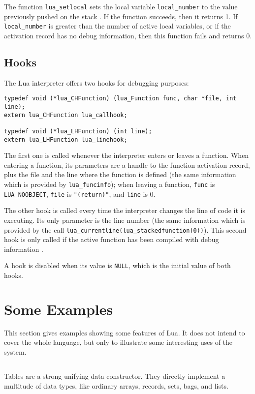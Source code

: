 The function \verb'lua_setlocal' sets the local variable
\verb'local_number' to the value previously pushed on the stack
.
If the function succeeds, then it returns 1.
If \verb'local_number' is greater than the number
of active local variables,
or if the activation record has no debug information,
then this function fails and returns 0.

\subsection{Hooks}

The Lua interpreter offers two hooks for debugging purposes:
\begin{verbatim}
typedef void (*lua_CHFunction) (lua_Function func, char *file, int line);
extern lua_CHFunction lua_callhook;

typedef void (*lua_LHFunction) (int line);
extern lua_LHFunction lua_linehook;
\end{verbatim}
The first one is called whenever the interpreter enters or leaves a
function.
When entering a function,
its parameters are a handle to the function activation record,
plus the file and the line where the function is defined (the same
information which is provided by \verb'lua_funcinfo');
when leaving a function, \verb'func' is \verb'LUA_NOOBJECT',
\verb'file' is \verb'"(return)"', and \verb'line' is 0.

The other hook is called every time the interpreter changes
the line of code it is executing.
Its only parameter is the line number
(the same information which is provided by the call
\verb'lua_currentline(lua_stackedfunction(0))').
This second hook is only called if the active function
has been compiled with debug information .

A hook is disabled when its value is \verb|NULL|,
which is the initial value of both hooks.


\section{Some Examples}

This section gives examples showing some features of Lua.
It does not intend to cover the whole language,
but only to illustrate some interesting uses of the system.


\subsection{}
Tables are a strong unifying data constructor.
They directly implement a multitude of data types,
like ordinary arrays, records, sets, bags, and lists.

